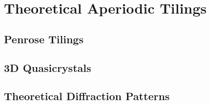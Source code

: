\section{Theoretical Aperiodic Tilings}

\subsection{Penrose Tilings}

\subsection{3D Quasicrystals}

\subsection{Theoretical Diffraction Patterns}
